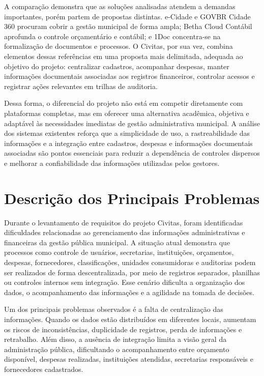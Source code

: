 A comparação demonstra que as soluções analisadas atendem a demandas importantes, porém partem de propostas distintas. e-Cidade e GOVBR Cidade 360 procuram cobrir a gestão municipal de forma ampla; Betha Cloud Contábil aprofunda o controle orçamentário e contábil; e 1Doc concentra-se na formalização de documentos e processos. O Civitas, por sua vez, combina elementos dessas referências em uma proposta mais delimitada, adequada ao objetivo do projeto: centralizar cadastros, acompanhar despesas, manter informações documentais associadas aos registros financeiros, controlar acessos e registrar ações relevantes em trilhas de auditoria.

Dessa forma, o diferencial do projeto não está em competir diretamente com plataformas completas, mas em oferecer uma alternativa acadêmica, objetiva e adaptável às necessidades imediatas de gestão administrativa municipal. A análise dos sistemas existentes reforça que a simplicidade de uso, a rastreabilidade das informações e a integração entre cadastros, despesas e informações documentais associadas são pontos essenciais para reduzir a dependência de controles dispersos e melhorar a confiabilidade das informações utilizadas pelos gestores.

\section{Descrição dos Principais Problemas}

Durante o levantamento de requisitos do projeto Civitas, foram identificadas dificuldades relacionadas ao gerenciamento das informações administrativas e financeiras da gestão pública municipal. A situação atual demonstra que processos como controle de usuários, secretarias, instituições, orçamentos, despesas, fornecedores, classificações, unidades consumidoras e auditorias podem ser realizados de forma descentralizada, por meio de registros separados, planilhas ou controles internos sem integração. Esse cenário dificulta a organização dos dados, o acompanhamento das informações e a agilidade na tomada de decisões.

Um dos principais problemas observados é a falta de centralização das informações. Quando os dados estão distribuídos em diferentes locais, aumentam os riscos de inconsistências, duplicidade de registros, perda de informações e retrabalho. Além disso, a ausência de integração limita a visão geral da administração pública, dificultando o acompanhamento entre orçamento disponível, despesas realizadas, instituições atendidas, secretarias responsáveis e fornecedores cadastrados.

